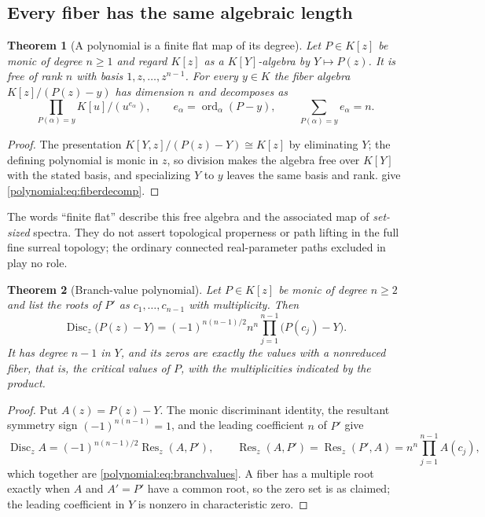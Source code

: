 \documentclass[11pt,letterpaper]{article}
\numberwithin{equation}{section}
\newtheorem{theorem}{Theorem}[section]
\theoremstyle{definition}
\theoremstyle{remark}\newtheorem{remark}[theorem]{Remark}
\newcommand{\ord}{\operatorname{ord}}
\newcommand{\Res}{\operatorname{Res}}
\newcommand{\Disc}{\operatorname{Disc}}
\begin{document}
\subsection{Every fiber has the same algebraic length}
\begin{theorem}[A polynomial is a finite flat map of its degree]
\label{polynomial:thm:finitemap}
Let $P\in K[z]$ be monic of degree $n\ge1$ and regard $K[z]$ as a
$K[Y]$-algebra by $Y\mapsto P(z)$. It is free of rank $n$ with basis
$1,z,\ldots,z^{n-1}$. For every $y\in K$ the fiber algebra $K[z]/(P(z)-y)$ has
dimension $n$ and decomposes as
\begin{equation}\label{polynomial:eq:fiberdecomp}
 \prod_{P(\alpha)=y}K[u]/(u^{e_\alpha}),\qquad
 e_\alpha=\ord_\alpha(P-y),\qquad \sum_{P(\alpha)=y}e_\alpha=n .
\end{equation}
\end{theorem}
\begin{proof}
The presentation $K[Y,z]/(P(z)-Y)\cong K[z]$ by eliminating $Y$; the defining
polynomial is monic in $z$, so division makes the algebra free over $K[Y]$
with the stated basis, and specializing $Y$ to $y$ leaves the same basis and
rank.  give
\eqref{polynomial:eq:fiberdecomp}.
\end{proof}

The words ``finite flat'' describe this free algebra and the associated map of
\emph{set-sized} spectra. They do not assert topological properness or path
lifting in the full fine surreal topology; the ordinary connected
real-parameter paths excluded in \cite{polynomial:SourceAnalysis} play no role.

\begin{theorem}[Branch-value polynomial]\label{polynomial:thm:branchvalues}
Let $P\in K[z]$ be monic of degree $n\ge2$ and list the roots of $P'$ as
$c_1,\ldots,c_{n-1}$ with multiplicity. Then
\begin{equation}\label{polynomial:eq:branchvalues}
 \Disc_z\bigl(P(z)-Y\bigr)=(-1)^{n(n-1)/2}n^n\prod_{j=1}^{n-1}\bigl(P(c_j)-Y\bigr).
\end{equation}
It has degree $n-1$ in $Y$, and its zeros are exactly the values with a
nonreduced fiber, that is, the critical values of $P$, with the multiplicities
indicated by the product.
\end{theorem}
\begin{proof}
Put $A(z)=P(z)-Y$. The monic discriminant identity, the resultant
symmetry sign $(-1)^{n(n-1)}=1$, and the leading coefficient $n$ of $P'$
give
\[
 \Disc_zA=(-1)^{n(n-1)/2}\Res_z(A,P'),\qquad
 \Res_z(A,P')=\Res_z(P',A)=n^n\prod_{j=1}^{n-1}A(c_j),
\]
which together are \eqref{polynomial:eq:branchvalues}. A fiber has a multiple root exactly when
$A$ and $A'=P'$ have a common root, so the zero set is as claimed; the leading
coefficient in $Y$ is nonzero in characteristic zero.
\end{proof}
\end{document}
